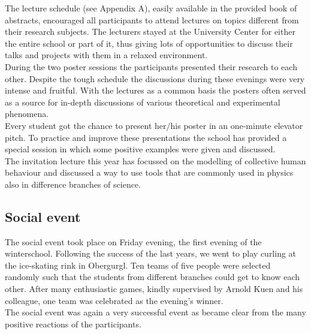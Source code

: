 \documentclass[11pt,a4paper]{article}
\numberwithin{equation}{section}
\numberwithin{table}{section}\setlength{\multlinegap}{25pt}
\begin{document}
The lecture schedule (see Appendix A), easily available in the provided book of abstracts, encouraged all participants to attend lectures on topics different from their research subjects. The lecturers stayed at the University Center for either the entire school or part of it, thus giving lots of opportunities to discuss their talks and projects with them in a relaxed environment. \\
During the two poster sessions the participants presented their research to each other. Despite the tough schedule the discussions during these evenings were very intense and fruitful. With the lectures as a common basis the posters often served as a source for in-depth discussions of various theoretical and experimental phenomena.\\
Every student got the chance to present her/his poster in an one-minute elevator pitch. To practice and improve these presentations the school has provided a special session in which some positive examples were given and discussed.\\
The invitation lecture this year has focussed on the modelling of collective human behaviour and discussed a way to use tools that are commonly used in physics also in difference branches of science. 

\subsection*{Social event}
The social event took place on Friday evening, the first evening of the winterschool. Following the success of the last years, we went to play curling at the ice-skating rink in Obergurgl. Ten teams of five people were selected randomly such that the students from different branches could get to know each other. After many enthusiastic games, kindly supervised by Arnold Kuen and his colleague, one team was celebrated as the evening's winner.\\ The social event was again a very successful event as became clear from the many positive reactions of the participants.
%
%
%
\end{document}
